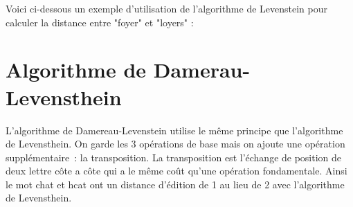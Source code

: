 \documentclass[final, 10pt]{report}
\begin{document}
Voici ci-dessous un exemple d'utilisation de l'algorithme de Levenstein pour calculer la distance entre "foyer" et "loyers" :\\
\section{Algorithme de Damerau-Levensthein\cite{noauthor_distance_2020}}

    L'algorithme de Damereau-Levenstein utilise le même principe que l'algorithme de Levensthein.
    On garde les 3 opérations de base mais on ajoute une opération supplémentaire~: la transposition.
    La transposition est l'échange de position de deux lettre côte a côte qui a le même coût qu'une opération fondamentale.
    Ainsi le mot \fg chat \og{} et \fg hcat\fg{} ont un distance d'édition de 1 au lieu de 2 avec l'algorithme de Levensthein.
    
\end{document}
